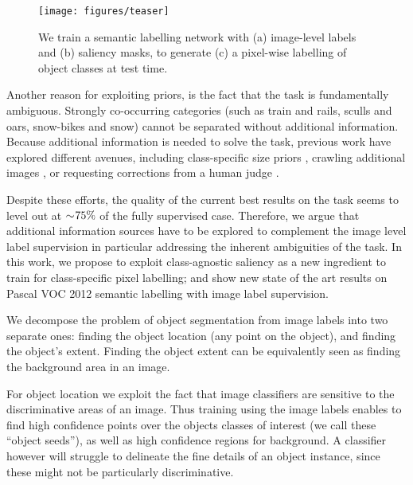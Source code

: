 \documentclass[british,10pt,twocolumn,letterpaper]{article}
\begin{document}
\begin{figure}
\begin{centering}
\texttt{[image: figures/teaser]}
\par\end{centering}
\caption{\label{fig:teaser}We train a semantic labelling network with (a)
image-level labels and (b) saliency masks, to generate (c) a pixel-wise
labelling of object classes at test time.}
\end{figure}

Another reason for exploiting priors, is the fact that the task is
fundamentally ambiguous. Strongly co-occurring categories (such as
train and rails, sculls and oars, snow-bikes and snow) cannot be separated
without additional information. Because additional information is
needed to solve the task, previous work have explored different avenues,
including class-specific size priors \cite{Pathak2015Iccv}, crawling
additional images \cite{Pinheiro2015Cvpr,Wei2015ArXiv}, or requesting
corrections from a human judge \cite{Kolesnikov2016Bmvc,Saleh2016Eccv}.

Despite these efforts, the quality of the current best results on
the task seems to level out at $\sim\negmedspace75\%$ of the fully
supervised case. Therefore, we argue that additional information sources
have to be explored to complement the image level label supervision
\textendash{} in particular addressing the inherent ambiguities of
the task. In this work, we propose to exploit class-agnostic saliency
as a new ingredient to train for class-specific pixel labelling; and
show new state of the art results on Pascal VOC 2012 semantic labelling
with image label supervision.

We decompose the problem of object segmentation from image labels
into two separate ones: finding the object location (any point on
the object), and finding the object's extent. Finding the object extent
can be equivalently seen as finding the background area in an image. 

For object location we exploit the fact that image classifiers are
sensitive to the discriminative areas of an image. Thus training using
the image labels enables to find high confidence points over the objects
classes of interest (we call these ``object seeds''), as well as
high confidence regions for background. A classifier however will
struggle to delineate the fine details of an object instance, since
these might not be particularly discriminative.
\end{document}
